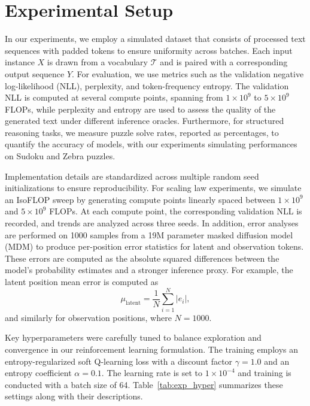 \documentclass{article}
\begin{document}
\section{Experimental Setup}
In our experiments, we employ a simulated dataset that consists of processed text sequences with padded tokens to ensure uniformity across batches. Each input instance \(X\) is drawn from a vocabulary \(\mathcal{T}\) and is paired with a corresponding output sequence \(Y\). For evaluation, we use metrics such as the validation negative log-likelihood (NLL), perplexity, and token-frequency entropy. The validation NLL is computed at several compute points, spanning from \(1 \times 10^9\) to \(5 \times 10^9\) FLOPs, while perplexity and entropy are used to assess the quality of the generated text under different inference oracles. Furthermore, for structured reasoning tasks, we measure puzzle solve rates, reported as percentages, to quantify the accuracy of models, with our experiments simulating performances on Sudoku and Zebra puzzles.

Implementation details are standardized across multiple random seed initializations to ensure reproducibility. For scaling law experiments, we simulate an IsoFLOP sweep by generating compute points linearly spaced between \(1 \times 10^9\) and \(5 \times 10^9\) FLOPs. At each compute point, the corresponding validation NLL is recorded, and trends are analyzed across three seeds. In addition, error analyses are performed on 1000 samples from a 19M parameter masked diffusion model (MDM) to produce per-position error statistics for latent and observation tokens. These errors are computed as the absolute squared differences between the model's probability estimates and a stronger inference proxy. For example, the latent position mean error is computed as 
\[
\mu_{\text{latent}} = \frac{1}{N}\sum_{i=1}^{N} \lvert e_i \rvert,
\]
and similarly for observation positions, where \(N=1000\).

Key hyperparameters were carefully tuned to balance exploration and convergence in our reinforcement learning formulation. The training employs an entropy-regularized soft Q-learning loss with a discount factor \(\gamma=1.0\) and an entropy coefficient \(\alpha=0.1\). The learning rate is set to \(1 \times 10^{-4}\) and training is conducted with a batch size of 64. Table~\ref{tab:exp_hyper} summarizes these settings along with their descriptions.
\end{document}
